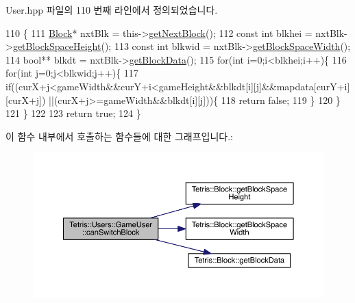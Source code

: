 User.\+hpp 파일의 110 번째 라인에서 정의되었습니다.


\begin{DoxyCode}
110                                                                                                            
                                     \{
111                     \hyperlink{class_tetris_1_1_block}{Block}* nxtBlk = this->\hyperlink{class_tetris_1_1_users_1_1_game_user_a9300608a38f8a3b10f9d6b6bdaeaab18}{getNextBlock}();
112                     \textcolor{keyword}{const} \textcolor{keywordtype}{int} blkhei = nxtBlk->\hyperlink{class_tetris_1_1_block_a5301977e32c03aaf122fa289fcba77ba}{getBlockSpaceHeight}();
113                     \textcolor{keyword}{const} \textcolor{keywordtype}{int} blkwid = nxtBlk->\hyperlink{class_tetris_1_1_block_ac390e14de476582300d815d9054ed9bd}{getBlockSpaceWidth}();
114                      \textcolor{keywordtype}{bool}** blkdt = nxtBlk->\hyperlink{class_tetris_1_1_block_a9bd2c3d6ccacff9a5f56f72336ba324f}{getBlockData}();
115                     \textcolor{keywordflow}{for}(\textcolor{keywordtype}{int} i=0;i<blkhei;i++)\{
116                         \textcolor{keywordflow}{for}(\textcolor{keywordtype}{int} j=0;j<blkwid;j++)\{
117                             \textcolor{keywordflow}{if}((curX+j<gameWidth&&curY+i<gameHeight&&blkdt[i][j]&&mapdata[curY+i][curX+j])
      ||(curX+j>=gameWidth&&blkdt[i][j]))\{
118                                 \textcolor{keywordflow}{return} \textcolor{keyword}{false};
119                             \}
120                         \}
121                     \}
122                     
123                     \textcolor{keywordflow}{return} \textcolor{keyword}{true};
124                 \}
\end{DoxyCode}
이 함수 내부에서 호출하는 함수들에 대한 그래프입니다.\+:
\nopagebreak
\begin{figure}[H]
\begin{center}
\leavevmode
\includegraphics[width=350pt]{d8/d9a/class_tetris_1_1_users_1_1_game_user_a1962ed051506010440645f7f3b50760d_cgraph}
\end{center}
\end{figure}
\mbox{\label{class_tetris_1_1_users_1_1_game_user_a82ea0dfdb99643a1b577a22f5e504346}} 
